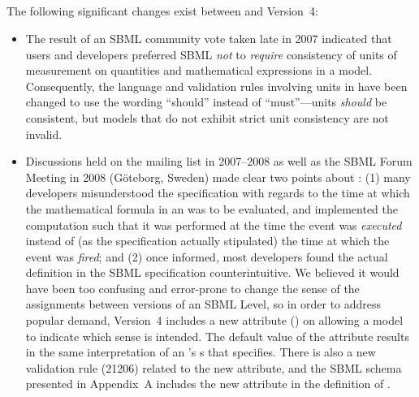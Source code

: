 \begin{blockChanged}

\renewcommand{\thesubsection}{\changed{\Alph{section}}.\changed{\arabic{subsection}}}

\subsection{}

The following significant changes exist between \sbmltwothree and
Version~4:
\begin{itemize}

\item The result of an SBML community vote taken late in 2007
  indicated that users and developers preferred SBML \emph{not} to
  \emph{require} consistency of units of measurement on quantities
  and mathematical expressions in a model.  Consequently, the
  language and validation rules involving units in \sbmltwofour
  have been changed to use the wording ``should'' instead of
  ``must''---units \emph{should} be consistent, but models that do
  not exhibit strict unit consistency are not invalid.

\item Discussions held on the
   mailing
  list in 2007--2008 as well as the SBML Forum Meeting in 2008
  (G\"{o}teborg, Sweden) made clear two points about \Event: (1)
  many developers misunderstood the specification with regards to
  the time at which the mathematical formula in an
  \EventAssignment was to be evaluated, and implemented the
  computation such that it was performed at the time the event was
  \emph{executed} instead of (as the specification actually
  stipulated) the time at which the event was \emph{fired}; and
  (2) once informed, most developers found the actual definition
  in the SBML specification counterintuitive.  We believed it
  would have been too confusing and error-prone to change the
  sense of the assignments between versions of an SBML Level, so
  in order to address popular demand, Version~4 includes a new
  attribute () on \Event allowing
  a model to indicate which sense is intended.  The default value
  of the  attribute results in the
  same interpretation of an \Event's \EventAssignment{}s that
  \sbmltwothree specifies.  There is also a new validation rule
  (21206) related to the new attribute, and the SBML schema
  presented in Appendix~A includes the new
   attribute in the definition of
  \Event.


\end{itemize}
\end{blockChanged}
